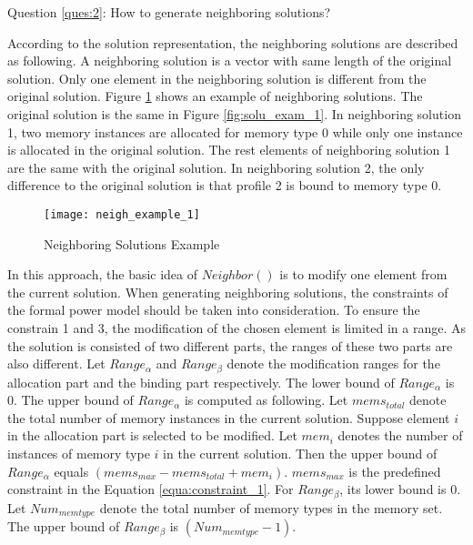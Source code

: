 		Question \ref{ques:2}: How to generate neighboring solutions?
		
		According to the solution representation, the neighboring solutions are described
		as following. 
		A neighboring solution is a vector with same length of the
		original solution. Only one element in the neighboring solution is different from the
		original solution.
		Figure \ref{fig:neigh_solu_exam_1} shows an example of neighboring solutions.
		The original solution is the same in Figure \ref{fig:solu_exam_1}.
		In neighboring solution 1, two memory instances are allocated for memory type 0
		while only one instance is allocated in the original solution.
		The rest elements of neighboring solution 1 are the same with the original solution.
		In neighboring solution 2, the only difference to the original solution is that
		profile 2 is bound to memory type 0.
		\begin{figure}[h]
			\begin{center}
				\texttt{[image: neigh\_example\_1]}
				\caption{Neighboring Solutions Example}
				\label{fig:neigh_solu_exam_1}
			\end{center}
		\end{figure}

		In this approach, the basic idea of $Neighbor()$ is to modify one element from the
		current solution. When generating neighboring solutions, the constraints of the formal
		power model should be taken into consideration.
		To ensure the constrain 1 and 3, the modification of the chosen element is limited in a
		range. As the solution is consisted of two different parts, the ranges of these
		two parts are also different.
		Let $Range_{\alpha}$ and $Range_{\beta}$ denote the modification ranges for
		the allocation part and the binding part respectively.
		The lower bound of $Range_{\alpha}$ is 0. The upper bound of $Range_{\alpha}$ is
		computed as following.
		Let $mems_{total}$ denote the total number of memory instances in the current solution.
		Suppose element $i$ in the allocation part is selected to be modified.
		Let $mem_{i}$ denotes the number of instances of memory type $i$ in the current solution.		
		Then the upper bound of $Range_{\alpha}$ equals $(mems_{max}-mems_{total}+mem_{i})$.
		$mems_{max}$ is the predefined constraint in the Equation \ref{equa:constraint_1}.
		For $Range_{\beta}$, its lower bound is 0.
		Let $Num_{memtype}$ denote the total number of memory types in the memory set.
		The upper bound of $Range_{\beta}$ is $(Num_{memtype}-1)$.
		
